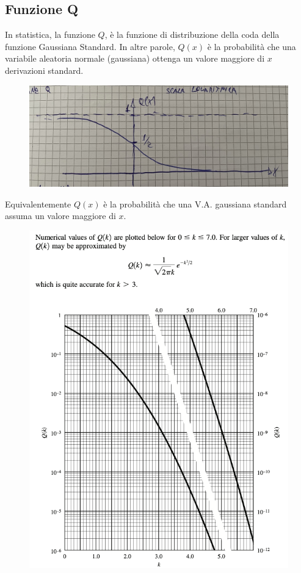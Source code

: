 \documentclass{article}
\begin{document}
\subsection{Funzione Q}

In statistica, la funzione \(Q\), è la funzione di distribuzione della coda della funzione Gaussiana Standard.
In altre parole, \(Q(x)\) è la probabilità che una variabile aleatoria normale (gaussiana) ottenga un valore maggiore di  \(x\) derivazioni standard.
\begin{figure}[ht]
\centering
\includegraphics[scale=0.1]{1.Q1.jpeg}
\end{figure}

Equivalentemente \(Q(x)\) è la probabilità che una V.A. gaussiana standard assuma un valore maggiore di \(x\).
\begin{figure}[ht]
\centering
\includegraphics[scale=0.4]{2.Q2.png}
\end{figure}
\end{document}
